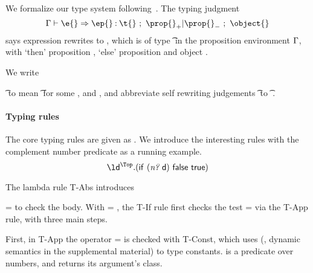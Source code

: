 We formalize our type system following~\citet{TF10}.
The typing judgment 
$$
{\judgementrewrite   {\propenv}
              {\e{}} {\t{}}
  {\filterset {\thenprop {\prop{}}}
              {\elseprop {\prop{}}}}
  {\object{}}
  {\ep{}}}
$$
says expression \e{} rewrites to \ep{}, which
is of type \t{} in the 
proposition environment $\Gamma{}$, with 
`then' proposition {\thenprop {\prop{}}}, `else' proposition {\elseprop {\prop{}}}
and object \object{}. 

We write 
{\judgementtworewrite{\propenv}{\e{}} {\t{}}{\ep{}} 
to mean 
{\judgementrewrite   {\propenv}
              {\e{}} {\t{}}
  {\filterset {\thenprop {\propp{}}}
              {\elseprop {\propp{}}}}
  {\objectp{}}
  {\ep{}}}
for some {\thenprop {\propp{}}}, {\elseprop {\propp{}}}
and {\objectp{}},
and
  abbreviate self rewriting judgements
{\judgementrewrite   {\propenv}
              {\e{}} {\t{}}
  {\filterset {\thenprop {\prop{}}}
              {\elseprop {\prop{}}}}
  {\object{}}
  {\e{}}}
to
{\judgementselfrewrite   {\propenv}
              {\e{}} {\t{}}
  {\filterset {\thenprop {\prop{}}}
              {\elseprop {\prop{}}}}
  {\object{}}}.


\paragraph{Typing rules}

The core typing rules are
given as . We introduce
the interesting rules with the complement number predicate
as a running example.
\begin{equation}
\abs{\makelocal{d}}{\Top}{\ifexp{\appexp{\numberhuh{}}{\makelocal{d}}}{\false{}}{\true{}}}
\end{equation}

The lambda rule T-Abs introduces \isprop{\s{}}{\x{}}} = 
to check the body.
With \propenv{} = ,
the T-If rule first checks the test  = {}
via the T-App rule, with three main steps.

First, in T-App the operator \e{} = \numberhuh{} is checked with T-Const, which
uses 
\constanttypeliteral{} (, dynamic semantics in the supplemental material)
to type constants.
\numberhuh{} is a predicate over numbers, and
\classconst{} returns its argument's class.

